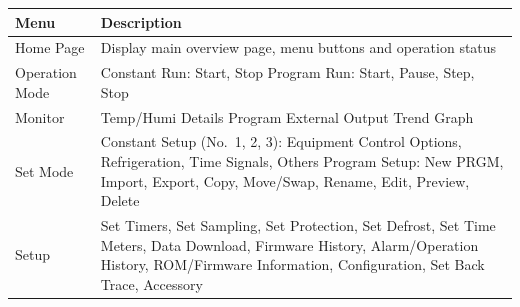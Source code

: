 \documentclass[11pt,twoside]{book}
\begin{document}
{{{{{{{{{{{{\begin{longtable}[]{@{}ll@{}}
\toprule
\begin{minipage}[b]{0.13\columnwidth}\raggedright
Menu\strut
\end{minipage} & \begin{minipage}[b]{0.81\columnwidth}\raggedright
Description\strut
\end{minipage}\tabularnewline
\midrule
\endhead
\begin{minipage}[t]{0.13\columnwidth}\raggedright
Home Page\strut
\end{minipage} & \begin{minipage}[t]{0.81\columnwidth}\raggedright
Display main overview page, menu buttons and operation status\strut
\end{minipage}\tabularnewline
\begin{minipage}[t]{0.13\columnwidth}\raggedright
Operation Mode\strut
\end{minipage} & \begin{minipage}[t]{0.81\columnwidth}\raggedright
Constant Run: Start, Stop Program Run: Start, Pause, Step, Stop\strut
\end{minipage}\tabularnewline
\begin{minipage}[t]{0.13\columnwidth}\raggedright
Monitor\strut
\end{minipage} & \begin{minipage}[t]{0.81\columnwidth}\raggedright
Temp/Humi Details Program External Output Trend Graph\strut
\end{minipage}\tabularnewline
\begin{minipage}[t]{0.13\columnwidth}\raggedright
Set Mode\strut
\end{minipage} & \begin{minipage}[t]{0.81\columnwidth}\raggedright
Constant Setup (No.~1, 2, 3): Equipment Control Options, Refrigeration,
Time Signals, Others Program Setup: New PRGM, Import, Export, Copy,
Move/Swap, Rename, Edit, Preview, Delete\strut
\end{minipage}\tabularnewline
\begin{minipage}[t]{0.13\columnwidth}\raggedright
Setup\strut
\end{minipage} & \begin{minipage}[t]{0.81\columnwidth}\raggedright
Set Timers, Set Sampling, Set Protection, Set Defrost, Set Time Meters,
Data Download, Firmware History, Alarm/Operation History, ROM/Firmware
Information, Configuration, Set Back Trace, Accessory\strut
\end{minipage}\tabularnewline
\bottomrule
\end{longtable}

}}}}}}}}}}}}
\end{document}
